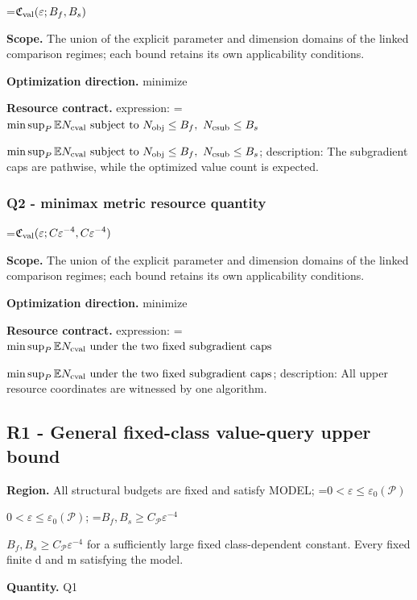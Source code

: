 \documentclass[10pt,a4paper]{article}
\newcommand{\AtlasMath}[1]{\par\begingroup\centering\setbox0=\hbox{$\displaystyle #1$}\ifdim\wd0>1.4\linewidth\typeout{ATLAS WIDE FORMULA: \the\wd0}\fi\ifdim\wd0>\linewidth\resizebox{\linewidth}{!}{\box0}\else\box0\fi\par\endgroup}
\newcommand{\AtlasInlineMath}[1]{\begingroup\setbox0=\hbox{$#1$}\ifdim\wd0>.4\linewidth\endgroup\AtlasMath{#1}\else\endgroup$#1$\fi}
\begin{document}
\AtlasMath{\mathfrak C_{\rm val}(\varepsilon;B_f,B_s)}


\textbf{Scope.} The union of the explicit parameter and dimension domains of the linked comparison regimes; each bound retains its own applicability conditions.



\textbf{Optimization direction.} minimize



\textbf{Resource contract.} expression: \AtlasInlineMath{\min\sup_P\mathbb EN_{\rm cval}\ \text{subject to }N_{\rm obj}\le B_f,\ N_{\rm csub}\le B_s}; description: The subgradient caps are pathwise, while the optimized value count is expected.



\subsubsection{Q2 - minimax metric resource quantity}


\AtlasMath{\mathfrak C_{\rm val}(\varepsilon;C\varepsilon^{-4},C\varepsilon^{-4})}


\textbf{Scope.} The union of the explicit parameter and dimension domains of the linked comparison regimes; each bound retains its own applicability conditions.



\textbf{Optimization direction.} minimize



\textbf{Resource contract.} expression: \AtlasInlineMath{\min\sup_P\mathbb EN_{\rm cval}\ \text{under the two fixed subgradient caps}}; description: All upper resource coordinates are witnessed by one algorithm.



\subsection{R1 - General fixed-class value-query upper bound}


\textbf{Region.} All structural budgets are fixed and satisfy MODEL; \AtlasInlineMath{0<\varepsilon\le\varepsilon_0(\mathcal P)}; \AtlasInlineMath{B_f,B_s\ge C_{\mathcal P}\varepsilon^{-4}} for a sufficiently large fixed class-dependent constant. Every fixed finite d and m satisfying the model.



\textbf{Quantity.} Q1
\end{document}
